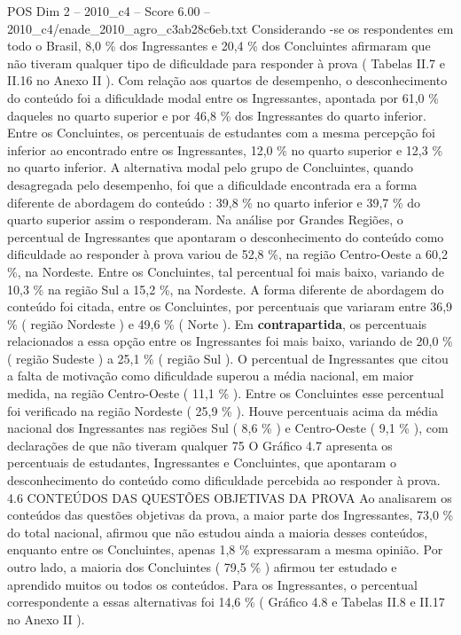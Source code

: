 \begin{textsample}{POS Dim 2 – 2010\_c4 – Score 6.00 – 2010\_c4/enade\_2010\_agro\_c3ab28c6eb.txt}
Considerando -se os respondentes em todo o Brasil, 8,0 \% dos Ingressantes e 20,4 \% dos Concluintes afirmaram que não tiveram qualquer tipo de dificuldade para responder à prova ( Tabelas II.7 e II.16 no Anexo II ).
Com relação aos quartos de desempenho, o desconhecimento do conteúdo foi a dificuldade modal entre os Ingressantes, apontada por 61,0 \% daqueles no quarto superior e por 46,8 \% dos Ingressantes do quarto inferior.
Entre os Concluintes, os percentuais de estudantes com a mesma percepção foi inferior ao encontrado entre os Ingressantes, 12,0 \% no quarto superior e 12,3 \% no quarto inferior.
A alternativa modal pelo grupo de Concluintes, quando desagregada pelo desempenho, foi que a dificuldade encontrada era a forma diferente de abordagem do conteúdo : 39,8 \% no quarto inferior e 39,7 \% do quarto superior assim o responderam.
Na análise por Grandes Regiões, o percentual de Ingressantes que apontaram o desconhecimento do conteúdo como dificuldade ao responder à prova variou de 52,8 \%, na região Centro-Oeste a 60,2 \%, na Nordeste.
Entre os Concluintes, tal percentual foi mais baixo, variando de 10,3 \% na região Sul a 15,2 \%, na Nordeste.
A forma diferente de abordagem do conteúdo foi citada, entre os Concluintes, por percentuais que variaram entre 36,9 \% ( região Nordeste ) e 49,6 \% ( Norte ).
Em \textbf{contrapartida}, os percentuais relacionados a essa opção entre os Ingressantes foi mais baixo, variando de 20,0 \% ( região Sudeste ) a 25,1 \% ( região Sul ).
O percentual de Ingressantes que citou a falta de motivação como dificuldade superou a média nacional, em maior medida, na região Centro-Oeste ( 11,1 \% ).
Entre os Concluintes esse percentual foi verificado na região Nordeste ( 25,9 \% ).
Houve percentuais acima da média nacional dos Ingressantes nas regiões Sul ( 8,6 \% ) e Centro-Oeste ( 9,1 \% ), com declarações de que não tiveram qualquer 75 O Gráfico 4.7 apresenta os percentuais de estudantes, Ingressantes e Concluintes, que apontaram o desconhecimento do conteúdo como dificuldade percebida ao responder à prova. 4.6 CONTEÚDOS DAS QUESTÕES OBJETIVAS DA PROVA Ao analisarem os conteúdos das questões objetivas da prova, a maior parte dos Ingressantes, 73,0 \% do total nacional, afirmou que não estudou ainda a maioria desses conteúdos, enquanto entre os Concluintes, apenas 1,8 \% expressaram a mesma opinião.
Por outro lado, a maioria dos Concluintes ( 79,5 \% ) afirmou ter estudado e aprendido muitos ou todos os conteúdos.
Para os Ingressantes, o percentual correspondente a essas alternativas foi 14,6 \% ( Gráfico 4.8 e Tabelas II.8 e II.17 no Anexo II ).

\end{textsample}
